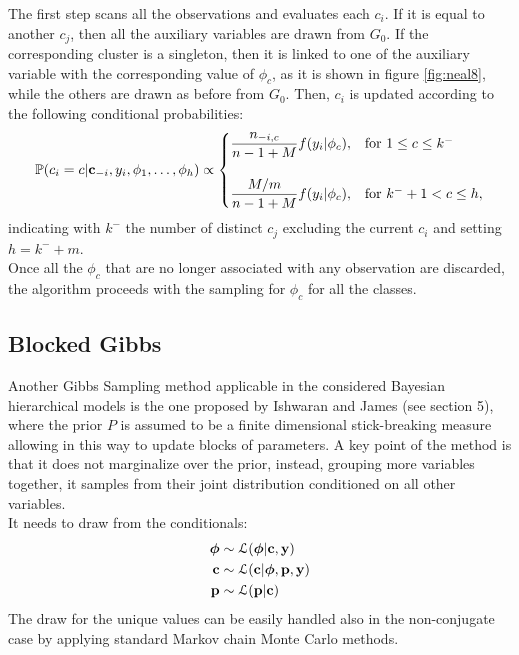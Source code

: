 The first step scans all the observations and evaluates each $c_i$.
If it is equal to another $c_j$, then all the auxiliary variables are drawn from $G_0$.
If the corresponding cluster is a singleton, then it is linked to one of the auxiliary variable with the corresponding value of $\phi_c$, as it is shown in figure \ref{fig:neal8}, while the others are drawn as before from $G_0$.
Then, $c_i$ is updated according to the following conditional probabilities:
\begin{equation}
	\begin{aligned} \label{neal8prob}
		\mathbb P(c_{i}=c | \mathbf c_{-i}, y_{i}, \phi_{1},\dots,\phi_{h}) \propto
		\begin{cases}
			\dfrac{n_{-i,c}}{n-1+M}f(y_{i}|\phi_{c}), & \mbox{for } 1 \leq c \leq k^{-} \\
			\\
			\dfrac{M/m}{n-1+M}f(y_{i}|\phi_{c}), & \mbox{for } k^{-}+1 < c \leq h,
		\end{cases}
	\end{aligned}
\end{equation}
indicating with $k^{-}$ the number of distinct $c_j$ excluding the current $c_i$ and setting $h=k^{-}+m$. \\
Once all the $\phi_c$ that are no longer associated with any observation are discarded, the algorithm proceeds with the sampling for $\phi_c$ for all the classes.

\subsection{Blocked Gibbs}
Another Gibbs Sampling method applicable in the considered Bayesian hierarchical models is the one proposed by Ishwaran and James (see \cite{james} section 5), where the prior $P$ is assumed to be a finite dimensional stick-breaking measure allowing in this way to update blocks of parameters.
A key point of the method is that it does not marginalize over the prior, instead, grouping more variables together, it samples from their joint distribution conditioned on all other variables. \\
It needs to draw from the conditionals:
\begin{align}
	\boldsymbol\phi &\sim \mathcal L(\boldsymbol\phi | \mathbf{c}, \mathbf{y}) \nonumber \\
	\mathbf{c} &\sim \mathcal L (\mathbf{c}| \boldsymbol\phi,\mathbf{p}, \mathbf{y}) \nonumber \\
	\mathbf{p} &\sim \mathcal L (\mathbf{p}| \mathbf{c}) \nonumber
\end{align}
The draw for the unique values can be easily handled also in the non-conjugate case by applying standard Markov chain Monte Carlo methods.
